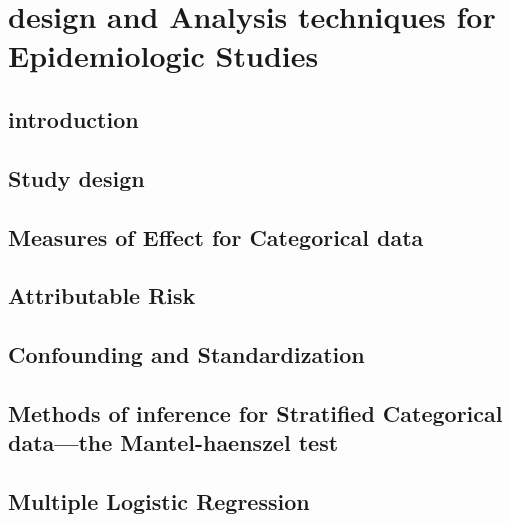 \documentclass[12pt,]{article}
\begin{document}
\hypertarget{design-and-analysis-techniques-for-epidemiologic-studies}{%
\section{design and Analysis techniques for Epidemiologic
Studies}\label{design-and-analysis-techniques-for-epidemiologic-studies}}

\hypertarget{introduction-8}{%
\subsection{introduction}\label{introduction-8}}

\hypertarget{study-design}{%
\subsection{Study design}\label{study-design}}

\hypertarget{measures-of-effect-for-categorical-data}{%
\subsection{Measures of Effect for Categorical
data}\label{measures-of-effect-for-categorical-data}}

\hypertarget{attributable-risk}{%
\subsection{Attributable Risk}\label{attributable-risk}}

\hypertarget{confounding-and-standardization}{%
\subsection{Confounding and
Standardization}\label{confounding-and-standardization}}

\hypertarget{methods-of-inference-for-stratified-categorical-datathe-mantel-haenszel-test}{%
\subsection{Methods of inference for Stratified Categorical data---the
Mantel-haenszel
test}\label{methods-of-inference-for-stratified-categorical-datathe-mantel-haenszel-test}}

\hypertarget{multiple-logistic-regression}{%
\subsection{Multiple Logistic
Regression}\label{multiple-logistic-regression}}
\end{document}
